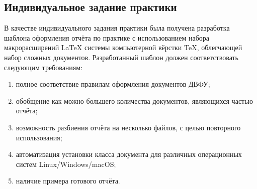 \documentclass[../document.tex]{subfiles}
\begin{document}
    \subsection{Индивидуальное задание практики}
    \par В качестве индивидуального задания практики была получена разработка шаблона оформления отчёта по практике с использованием набора макрорасширений \LaTeX\cite{latex} системы компьютерной вёрстки \TeX\cite{tex}, облегчающей набор сложных документов. Разработанный шаблон должен соответствовать следующим требованиям:
    \begin{enumerate}
        \item полное соответствие правилам оформления документов ДВФУ;
        \item обобщение как можно большего количества документов, являющихся частью отчёта;
        \item возможность разбиения отчёта на несколько файлов, с целью повторного использования;
        \item автоматизация установки класса документа для различных операционных систем Linux/Windows/macOS;
        \item наличие примера готового отчёта.
    \end{enumerate}
\end{document}
